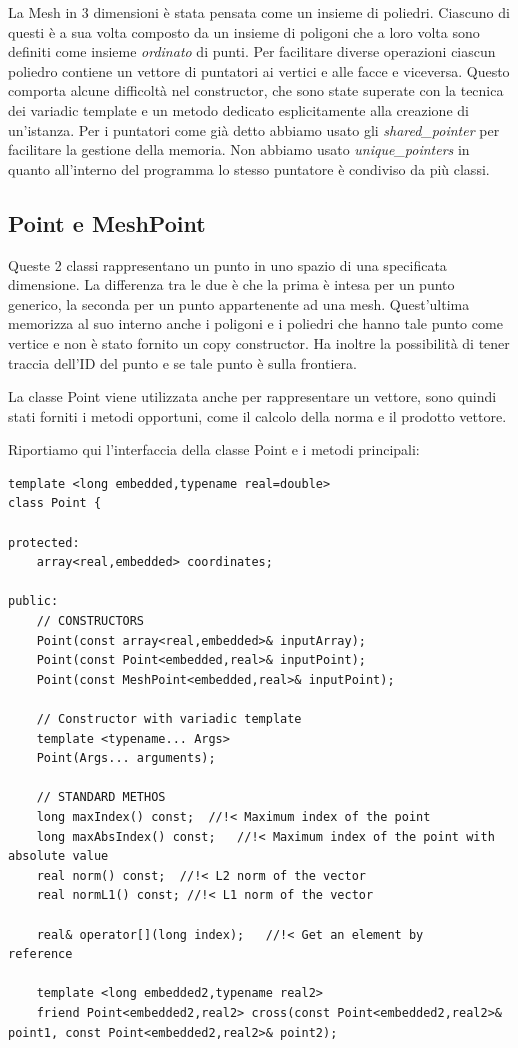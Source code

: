 \documentclass[oneside,12pt]{book}  %
\theoremstyle{plain}
\theoremstyle{definition}
\theoremstyle{remark}
\numberwithin{equation}{chapter} %
\begin{document}
La Mesh in 3 dimensioni \`e stata pensata come un insieme di
poliedri. Ciascuno di questi \`e a sua volta composto da un insieme di
poligoni che a loro volta sono definiti come insieme \textit{ordinato}
di punti. Per facilitare diverse operazioni ciascun poliedro contiene
un vettore di puntatori ai vertici e alle facce e viceversa. Questo
comporta alcune difficolt\`a nel constructor, che sono state superate
con la tecnica dei variadic template e un metodo dedicato
esplicitamente alla creazione di un'istanza. Per i puntatori come
gi\`a detto abbiamo usato gli \textit{shared\_pointer} per facilitare
la gestione della memoria. Non abbiamo usato \textit{unique\_pointers}
in quanto all'interno del programma lo stesso puntatore \`e condiviso
da pi\`u classi.

\subsection{Point e MeshPoint}
Queste 2 classi rappresentano un punto in uno spazio di una
specificata dimensione. La differenza tra le due \`e che la prima \`e
intesa per un punto generico, la seconda per un punto appartenente ad
una mesh. Quest'ultima memorizza al suo interno anche i poligoni e i
poliedri che hanno tale punto come vertice e non \`e stato fornito un
copy constructor. Ha inoltre la possibilit\`a di tener traccia dell'ID
del punto e se tale punto \`e sulla frontiera.

La classe Point viene utilizzata anche per rappresentare un vettore,
sono quindi stati forniti i metodi opportuni, come il calcolo della
norma e il prodotto vettore.

Riportiamo qui l'interfaccia della classe Point e i metodi principali:

\begin{verbatim}
template <long embedded,typename real=double>
class Point {

protected:
    array<real,embedded> coordinates;

public:
    // CONSTRUCTORS
    Point(const array<real,embedded>& inputArray);
    Point(const Point<embedded,real>& inputPoint);
    Point(const MeshPoint<embedded,real>& inputPoint);

    // Constructor with variadic template
    template <typename... Args>
    Point(Args... arguments);

    // STANDARD METHOS
    long maxIndex() const;	//!< Maximum index of the point
    long maxAbsIndex() const;	//!< Maximum index of the point with absolute value
    real norm() const;  //!< L2 norm of the vector
    real normL1() const; //!< L1 norm of the vector

    real& operator[](long index);	//!< Get an element by
reference

    template <long embedded2,typename real2>
    friend Point<embedded2,real2> cross(const Point<embedded2,real2>&
point1, const Point<embedded2,real2>& point2);
\end{verbatim}
\end{document}
